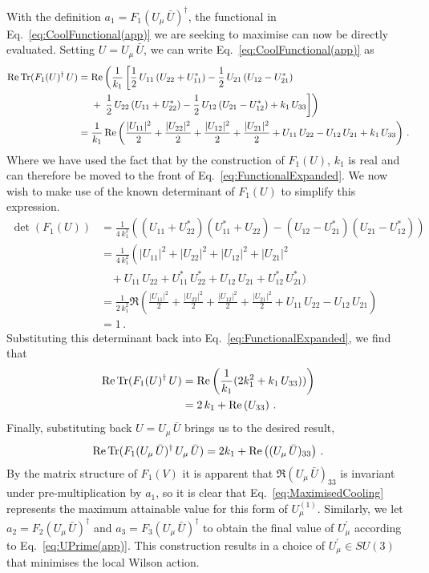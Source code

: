 With the definition $a_1 = F_1(U_\mu\,\bar{U})^\dagger$, the functional in Eq.~\eqref{eq:CoolFunctional(app)} we are seeking to maximise can now be directly evaluated. Setting $U = U_\mu\,\bar{U}$, we can write Eq.~\eqref{eq:CoolFunctional(app)} as 
%
\begin{align}
\operatorname{Re}\operatorname{Tr}(F_1(U)^\dagger\, U) &=\operatorname{Re} \left(\frac{1}{k_1}\left[ \frac{1}{2}\,U_{11} \left(U_{22} + U_{11}^*\right) - \frac{1}{2}\,U_{21} \left(U_{12} - U_{21}^*\right)\right.\right.\nonumber\\
&~~~~+ \left. \left.\frac{1}{2}\,U_{22} \left(U_{11} + U_{22}^*\right)
- \frac{1}{2}\,U_{12} \left(U_{21} - U_{12}^*\right) +k_1\,U_{33}\right]\right)\nonumber\\
&= \frac{1}{k_1}\operatorname{Re}\left(\frac{|U_{11}|^2}{2} + \frac{|U_{22}|^2}{2} + \frac{|U_{12}|^2}{2} + \frac{|U_{21}|^2}{2} + U_{11}\,U_{22} - U_{12}\,U_{21} + k_1\,U_{33}\right)\, .\label{eq:FunctionalExpanded}
\end{align}
%
Where we have used the fact that by the construction of $F_1(U)$, $k_1$ is real and can therefore be moved to the front of Eq.~\eqref{eq:FunctionalExpanded}. We now wish to make use of the known determinant of $F_1(U)$ to simplify this expression.
%
\begin{align*}
\det(F_1(U)) &= \frac{1}{4\,k_1^2} \left(\left(U_{11}+ U_{22}^*\right)\left(U_{11}^* + U_{22}\right)-\left(U_{12} - U_{21}^*\right)\left( U_{21} - U_{12}^*\right)\right)\\
&=\frac{1}{4\,k_1^2}\left( |U_{11}|^2 + |U_{22}|^2 + |U_{12}|^2 + |U_{21}|^2\right.\\
&~~~~+ U_{11}\,U_{22} + U_{11}^*\,U_{22}^* + U_{12}\,U_{21} + U_{12}^*\,U_{21}^*\big)\\
&= \frac{1}{2\,k_1^2}\Re\left(\frac{|U_{11}|^2}{2} + \frac{|U_{22}|^2}{2} + \frac{|U_{12}|^2}{2} + \frac{|U_{21}|^2}{2} + U_{11}\,U_{22} - U_{12}\,U_{21}\right)\\
&=1\, .
\end{align*}
%
Substituting this determinant back into Eq.~\eqref{eq:FunctionalExpanded}, we find that
%
\begin{align*}
\operatorname{Re}\operatorname{Tr}(F_1(U)^\dagger\, U) &= \operatorname{Re}\left(\frac{1}{k_1}(2k_1^2 + k_1\,U_{33}))\right)\\
&=2\,k_1 + \operatorname{Re}\left(U_{33}\right)\, .
\end{align*}
%
Finally, substituting back $U = U_\mu\,\bar{U}$ brings us to the desired result,
%
\begin{equation}
\operatorname{Re} \operatorname{Tr} (F_1(U_\mu\,\bar{U})^\dagger \, U_\mu \, \bar{U}) = 2k_1 + \operatorname{Re}\left( (U_\mu\, \bar{U})_{33}\right)\, .
\label{eq:MaximisedCooling}
\end{equation}
%
By the matrix structure of $F_1(V)$ it is apparent that $\Re(U_\mu\, \bar{U})_{33}$ is invariant under pre-multiplication by $a_1$, so it is clear that Eq.~\eqref{eq:MaximisedCooling} represents the maximum attainable value for this form of $U^{(1)}_\mu$. Similarly, we let $a_2=F_2(U_\mu\,\bar{U})^\dagger$ and $a_3=F_3(U_\mu\,\bar{U})^\dagger$ to obtain the final value of $U^\prime_\mu$ according to Eq.~\eqref{eq:UPrime(app)}. This construction results in a choice of $U_\mu^\prime \in SU(3)$ that minimises the local Wilson action.
